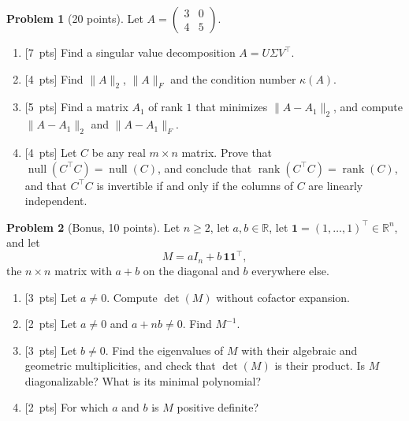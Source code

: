 \documentclass[11pt]{article}
\theoremstyle{definition}
\newtheorem{problem}{Problem}
\newcommand{\norm}[1]{\lVert #1 \rVert}
\newcommand{\pts}[1]{\textup{[#1~pts]}}
\DeclareMathOperator{\rank}{rank}
\DeclareMathOperator{\Null}{null}
\begin{document}
\begin{problem}[20 points]\label{pr:mid-svd}
    Let $A = \begin{pmatrix} 3 & 0 \\ 4 & 5 \end{pmatrix}$.
    \begin{enumerate}[label=(\alph*)]
        \item \pts{7} Find a singular value decomposition $A = U\Sigma V^\top$.
        \item \pts{4} Find $\norm{A}_2$, $\norm{A}_F$ and the condition number $\kappa(A)$.
        \item \pts{5} Find a matrix $A_1$ of rank $1$ that minimizes $\norm{A - A_1}_2$, and compute $\norm{A - A_1}_2$ and $\norm{A - A_1}_F$.
        \item \pts{4} Let $C$ be any real $m \times n$ matrix. Prove that $\Null(C^\top C) = \Null(C)$, and conclude that $\rank(C^\top C) = \rank(C)$, and that $C^\top C$ is invertible if and only if the columns of $C$ are linearly independent.
    \end{enumerate}
\end{problem}

\begin{problem}[Bonus, 10 points]\label{pr:mid-low-rank}
    Let $n \geq 2$, let $a, b \in \mathbb{R}$, let $\mathbf{1} = (1, \ldots, 1)^\top \in \mathbb{R}^n$, and let
    \[M = aI_n + b\,\mathbf{1}\mathbf{1}^\top,\]
    the $n \times n$ matrix with $a + b$ on the diagonal and $b$ everywhere else.
    \begin{enumerate}[label=(\alph*)]
        \item \pts{3} Let $a \neq 0$. Compute $\det(M)$ without cofactor expansion.
        \item \pts{2} Let $a \neq 0$ and $a + nb \neq 0$. Find $M^{-1}$.
        \item \pts{3} Let $b \neq 0$. Find the eigenvalues of $M$ with their algebraic and geometric multiplicities, and check that $\det(M)$ is their product. Is $M$ diagonalizable? What is its minimal polynomial?
        \item \pts{2} For which $a$ and $b$ is $M$ positive definite?
    \end{enumerate}
\end{problem}
\end{document}
